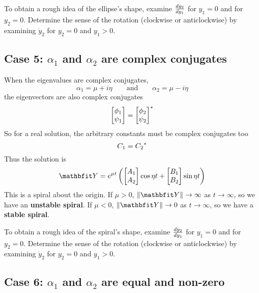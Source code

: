 To obtain a rough idea of the ellipse's shape, examine $\frac{dy_2}{dy_1}$ for
$y_1=0$ and for $y_2=0$.  Determine the sense of the rotation (clockwise or
anticlockwise) by examining $\dot{y}_2$ for $y_2=0$ and $y_1>0$.

\subsection{Case 5: $\alpha_1$ and $\alpha_2$ are complex conjugates}

When the eigenvalues are complex conjugates,
$$\alpha_1=\mu+i\eta\qquad\mbox{and}\qquad\alpha_2=\mu-i\eta$$
the eigenvectors are also complex conjugates
$$\begin{bmatrix} \phi_1 \\ \psi_1 \end{bmatrix} = 
{\begin{bmatrix} \phi_2 \\ \psi_2 \end{bmatrix}}^*$$
So for a real solution, the arbitrary constants must be complex conjugates
too
$$C_1={C_2}^*$$
Thus the solution is
$$\vect{Y}= e^{\mu t} \left(
\begin{bmatrix} A_1 \\ A_2 \end{bmatrix} \cos\eta t
+\begin{bmatrix} B_1\\ B_2 \end{bmatrix} \sin\eta t\right)$$
This is a spiral about the origin.  If $\mu>0$, $\left\|\vect{Y}\right\|
\to\infty$ as
$t\to\infty$, so we have an \textbf{unstable spiral}. If $\mu<0$, 
$\left\|\vect{Y}\right\|\to 0$ as $t\to\infty$, so we have a 
\textbf{stable spiral}.

\begin{center}
\hspace{3cm}
\end{center}

To obtain a rough idea of the spiral's shape, examine $\frac{dy_2}{dy_1}$ for
$y_1=0$ and for $y_2=0$.  Determine the sense of the rotation (clockwise or
anticlockwise) by examining $\dot{y}_2$ for $y_2=0$ and $y_1>0$.

\subsection{Case 6: $\alpha_1$ and $\alpha_2$ are equal and non-zero}


